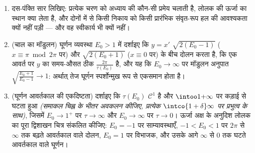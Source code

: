 \begin{problem}
\begin{enumerate}[resume]
        से कटाई कीजिए: निकाय अपना रूप बनाए रखता है, जिसमें $\alpha$
        और $\gamma$ के स्थान पर $\alpha - \varepsilon$ और $\gamma +
        \varepsilon$ आ जाते हैं। औसत
        जनसंख्याओं का क्या होता है? दांकोना के प्रेक्षण
        (1914--1918) की व्याख्या कीजिए: युद्ध के दौरान जब
        एड्रियाटिक में मछली पकड़ना घटा, तब पकड़ में परभक्षियों
        (शार्क) का अनुपात \emph{बढ़ गया} --- और यह भी कि मध्यम
        मछली पकड़ना शिकार को क्यों लाभ पहुँचाता है।
  \item दस-पंक्ति सार लिखिए: प्रत्येक चरण को अध्याय की कौन-सी
        प्रमेय चलाती है, लोलक की ऊर्जा का स्थान क्या लेता है, और
        दोनों में से किसी निकाय को किसी प्रारंभिक संवृत-रूप हल की
        आवश्यकता क्यों नहीं पड़ी --- और वह स्वीकार्य भी क्यों
        नहीं।

  \item (चाल का मॉडुलन) घूर्णन व्यवस्था $E_0 > 1$ में दर्शाइए कि
        $y = x'$ $\sqrt{2(E_0 - 1)}$ ($x \equiv \pi \bmod 2\pi$ पर) और $\sqrt{2(E_0 + 1)}$ ($x \equiv 0$ पर) के बीच दोलन
        करता है, कि एक आवर्त पर $y$ का समय-औसत ठीक $\frac{2\pi}{\tau(E_0)}$ है,
        और यह कि $E_0
        \to \infty$ पर मॉडुलन अनुपात $\sqrt{\frac{E_0 + 1}{E_0 - 1}} \to 1$: अर्थात् तेज घूर्णन
        स्पर्शोन्मुख रूप से एकसमान होता है।
  \item (घूर्णन आवर्तकाल की एकदिष्टता) दर्शाइए कि $\tau(E_0)$ $\mathcal C^1$ है
        और $\intoo1{+\infty}$ पर कड़ाई से घटता हुआ \emph{(समाकल चिह्न के भीतर
        अवकलन कीजिए, प्रत्येक $\intco{1 + \delta}\infty$ पर प्रभुत्व के साथ)}, जिसमें
        $E_0 \to 1^+$ पर $\tau \to \infty$ और $E_0 \to \infty$ पर $\tau
        \to 0$। ऊर्जा अक्ष के अनुदिश
        लोलक का पूरा द्विशाखन चित्र संकलित कीजिए: $E_0 = -1$ पर
        साम्यावस्थाएँ, $-1 < E_0 < 1$ पर $2\pi$ से $\infty$ तक बढ़ते आवर्तकाल
        वाले दोलन, $E_0 = 1$ पर विभाजक, और उसके आगे $\infty$ से $0$ तक
        घटते आवर्तकाल वाले घूर्णन।
\end{enumerate}
\end{problem}
